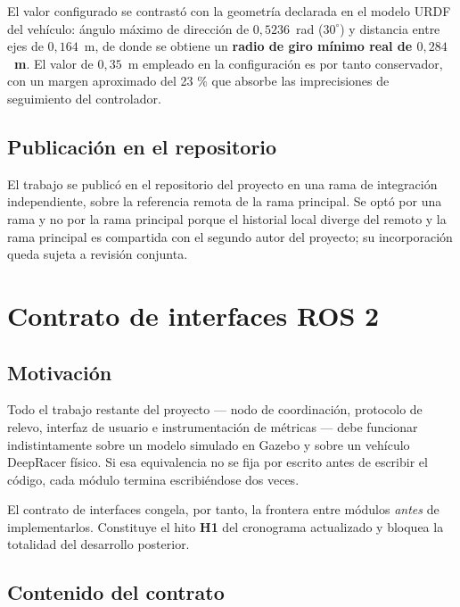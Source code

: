 \documentclass[12pt,letterpaper]{article}
\begin{document}
El valor configurado se contrastó con la geometría declarada en el modelo URDF del vehículo: ángulo máximo de dirección de $0{,}5236$~rad ($30^\circ$) y distancia entre ejes de $0{,}164$~m, de donde se obtiene un \textbf{radio de giro mínimo real de $0{,}284$~m}. El valor de $0{,}35$~m empleado en la configuración es por tanto conservador, con un margen aproximado del 23 \% que absorbe las imprecisiones de seguimiento del controlador.

\subsection{Publicación en el repositorio}

El trabajo se publicó en el repositorio del proyecto en una rama de integración independiente, sobre la referencia remota de la rama principal. Se optó por una rama y no por la rama principal porque el historial local diverge del remoto y la rama principal es compartida con el segundo autor del proyecto; su incorporación queda sujeta a revisión conjunta.

\section{Contrato de interfaces ROS 2}

\subsection{Motivación}

Todo el trabajo restante del proyecto --- nodo de coordinación, protocolo de relevo, interfaz de usuario e instrumentación de métricas --- debe funcionar indistintamente sobre un modelo simulado en Gazebo y sobre un vehículo DeepRacer físico. Si esa equivalencia no se fija por escrito antes de escribir el código, cada módulo termina escribiéndose dos veces.

El contrato de interfaces congela, por tanto, la frontera entre módulos \emph{antes} de implementarlos. Constituye el hito \textbf{H1} del cronograma actualizado y bloquea la totalidad del desarrollo posterior.

\subsection{Contenido del contrato}
\end{document}
